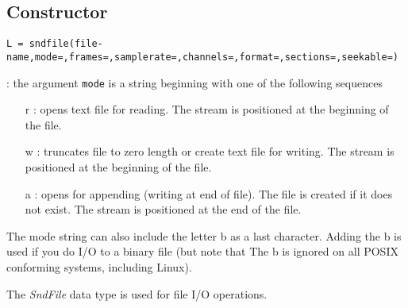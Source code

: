 
\begin{mandesc}
\end{mandesc}

\subsection*{Constructor}
\begin{verbatim}
L = sndfile(file-name,mode=,frames=,samplerate=,channels=,format=,sections=,seekable=)
\end{verbatim}
\begin{parameters}
  \begin{varlist}
    : the argument \verb+mode+ is a string beginning  with  one  of  the  following  sequences
    \begin{itemize}
      \item[r]: opens text file for reading. The stream is positioned at the beginning of the  file.
      \item[w]: truncates  file  to  zero  length  or create text file for writing.  The stream is
        positioned at the beginning of the file.
      \item[a]: opens for appending (writing at end of file).  The file is created if it does not 
	exist.  The stream is positioned at the end of the file.
    \end{itemize}
    The mode string can also include the letter b as a last character. 
    Adding the b is used if you do I/O to a binary file 
    (but note that The b is ignored on all POSIX conforming systems, including Linux).
  \end{varlist}
\end{parameters}

\begin{mandescription}
The \emph{SndFile} data type is used for file I/O operations.
\end{mandescription}

